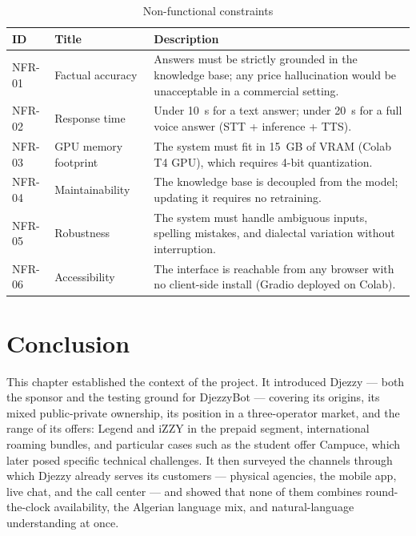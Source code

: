 \documentclass[12pt, a4paper]{report}
\newcommand{\humantext}[1]{#1}      %
\begin{document}
\begin{table}[H]
\centering
\caption{Non-functional constraints}
\label{tab:besoins_non_fonctionnels}
\begin{tabularx}{\textwidth}{l l X}
\toprule
\textbf{ID} & \textbf{Title} & \textbf{Description} \\
\midrule
NFR-01 & Factual accuracy     & Answers must be strictly grounded in the knowledge base; any price hallucination would be unacceptable in a commercial setting. \\
NFR-02 & Response time        & Under 10~s for a text answer; under 20~s for a full voice answer (STT + inference + TTS). \\
NFR-03 & GPU memory footprint & The system must fit in 15~GB of VRAM (Colab T4 GPU), which requires 4-bit quantization. \\
NFR-04 & Maintainability      & The knowledge base is decoupled from the model; updating it requires no retraining. \\
NFR-05 & Robustness           & The system must handle ambiguous inputs, spelling mistakes, and dialectal variation without interruption. \\
NFR-06 & Accessibility        & The interface is reachable from any browser with no client-side install (Gradio deployed on Colab). \\
\bottomrule
\end{tabularx}
\end{table}


\section{Conclusion}

\humantext{This chapter established the context of the project. It introduced Djezzy --- both the sponsor and the testing ground for DjezzyBot --- covering its origins, its mixed public-private ownership, its position in a three-operator market, and the range of its offers: Legend and iZZY in the prepaid segment, international roaming bundles, and particular cases such as the student offer Campuce, which later posed specific technical challenges. It then surveyed the channels through which Djezzy already serves its customers --- physical agencies, the mobile app, live chat, and the call center --- and showed that none of them combines round-the-clock availability, the Algerian language mix, and natural-language understanding at once.}
\end{document}
